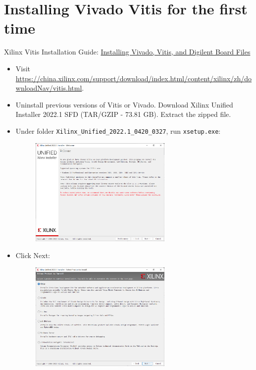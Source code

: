 \documentclass[a4paper,12pt,twoside]{article}
\begin{document}
\section{Installing Vivado Vitis for the first time}
Xilinx Vitis Installation Guide: \href{https://digilent.com/reference/programmable-logic/guides/installing-vivado-and-vitis}{Installing Vivado, Vitis, and Digilent Board Files}
\begin{itemize}
    \item Visit \url{https://china.xilinx.com/support/download/index.html/content/xilinx/zh/downloadNav/vitis.html}.
    \item Uninstall previous versions of Vitis or Vivado. Download Xilinx Unified Installer 2022.1 SFD (TAR/GZIP - 73.81 GB). Extract the zipped file.
    \item Under folder \texttt{Xilinx\_Unified\_2022.1\_0420\_0327}, run \texttt{xsetup.exe}:
    \begin{figure}[H]
        \centering
        \includegraphics[width=0.65\textwidth]{1.png}
    \end{figure}
    \item Click Next:
    \begin{figure}[H]
        \centering
        \includegraphics[width=0.65\textwidth]{2.png}

\end{figure}
\end{itemize}
\end{document}
